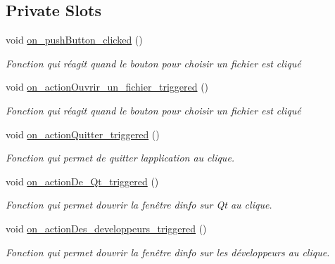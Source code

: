 \subsection*{Private Slots}
\begin{DoxyCompactItemize}
\item 
void \hyperlink{classMainWindowLaunchDialog_a4464510ed5080984f0af0d3c0559f9eb}{on\+\_\+push\+Button\+\_\+clicked} ()
\begin{DoxyCompactList}\small\item\em Fonction qui réagit quand le bouton pour choisir un fichier est cliqué \end{DoxyCompactList}\item 
void \hyperlink{classMainWindowLaunchDialog_a0cfb74c6cb22582d2b1047332008b9c0}{on\+\_\+action\+Ouvrir\+\_\+un\+\_\+fichier\+\_\+triggered} ()
\begin{DoxyCompactList}\small\item\em Fonction qui réagit quand le bouton pour choisir un fichier est cliqué \end{DoxyCompactList}\item 
void \hyperlink{classMainWindowLaunchDialog_aad807a24560cbcb3d864a1c6b678537e}{on\+\_\+action\+Quitter\+\_\+triggered} ()
\begin{DoxyCompactList}\small\item\em Fonction qui permet de quitter l\textquotesingle{}application au clique. \end{DoxyCompactList}\item 
void \hyperlink{classMainWindowLaunchDialog_a91bfa59302a3591b7b3b11b03d6f9b0e}{on\+\_\+action\+De\+\_\+\+Qt\+\_\+triggered} ()
\begin{DoxyCompactList}\small\item\em Fonction qui permet d\textquotesingle{}ouvrir la fenêtre d\textquotesingle{}info sur Qt au clique. \end{DoxyCompactList}\item 
void \hyperlink{classMainWindowLaunchDialog_aaa766b56e4327b3bedf7f88c1b52cee7}{on\+\_\+action\+Des\+\_\+developpeurs\+\_\+triggered} ()
\begin{DoxyCompactList}\small\item\em Fonction qui permet d\textquotesingle{}ouvrir la fenêtre d\textquotesingle{}info sur les développeurs au clique. \end{DoxyCompactList}\end{DoxyCompactItemize}
